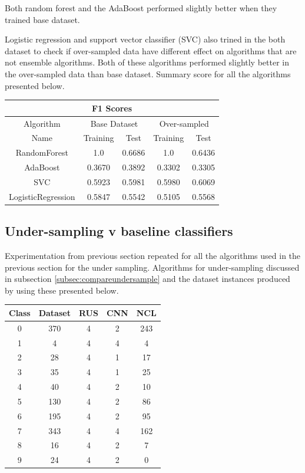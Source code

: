 \documentclass[12pt]{article}
\begin{document}
Both random forest and the AdaBoost performed slightly better when they trained base dataset. 

Logistic regression and support vector classifier (SVC) also trined in the both dataset to check if over-sampled data have different effect on algorithms that are not ensemble algorithms. Both of these algorithms performed slightly better in the over-sampled data than base dataset. Summary score for all the algorithms presented below.

\begin{center}
    \begin{tabular}{||c c c c c||} 
    \hline
    \multicolumn{5}{||c||}{F1 Scores} \\
    \hline
    Algorithm & \multicolumn{2}{c}{Base Dataset} & \multicolumn{2}{c||}{Over-sampled} \\
    Name & Training & Test & Training & Test \\ [0.5ex] 
    \hline\hline
    RandomForest & 1.0 & 0.6686 & 1.0 & 0.6436\\ 
    \hline
    AdaBoost & 0.3670 & 0.3892 & 0.3302 & 0.3305\\ 
    \hline
    SVC & 0.5923 & 0.5981 & 0.5980 & 0.6069\\ 
    \hline
    LogisticRegression & 0.5847 & 0.5542 & 0.5105 & 0.5568\\ [1ex] 
    \hline
   \end{tabular}
\end{center}

\subsection{Under-sampling v baseline classifiers} \label{subsec:undervbase}

Experimentation from previous section repeated for all the algorithms used in the previous section for the under sampling.
Algorithms for under-sampling discussed in subsection \ref{subsec:compareundersample} and the dataset instances produced by using these presented below.

\begin{center}
    \begin{tabular}{||c c c c c||} 
    \hline
    Class  & Dataset & RUS & CNN & NCL\\ [0.5ex] 
    \hline\hline
    0 & 370 & 4 & 2 & 243\\ 
    \hline
    1 & 4 & 4 & 4 & 4\\
    \hline
    2 & 28 & 4 & 1 & 17\\
    \hline
    3 & 35 & 4 & 1 & 25\\
    \hline
    4 & 40 & 4 & 2 & 10\\
    \hline
    5 & 130 & 4 & 2 & 86\\
    \hline
    6 & 195 & 4 & 2 & 95\\
    \hline
    7 & 343 & 4 & 4 & 162\\
    \hline
    8 & 16 & 4 & 2 & 7\\
    \hline
    9 & 24 & 4 & 2 & 0\\ [1ex] 
    \hline
   \end{tabular}
\end{center}
\end{document}
